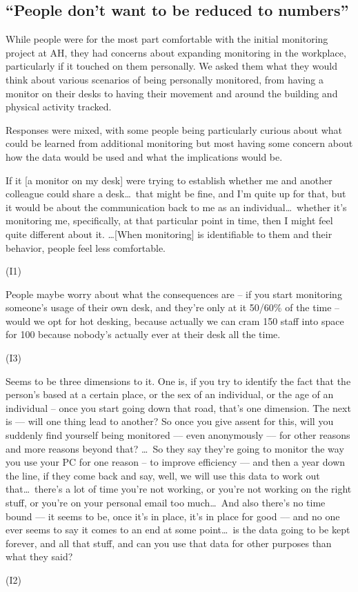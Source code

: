 \subsection{``People don’t want to be reduced to numbers”}
\label{sec:people-dont-want}

While people were for the most part comfortable with the initial
monitoring project at AH, they had concerns about expanding
monitoring in the workplace, particularly if it touched on them
personally. We asked them what they would think about various scenarios of being personally monitored, from having a monitor on their desks to having their movement and around the building and physical activity tracked.

Responses were mixed, with some people being particularly curious about what could be learned from additional monitoring but most having some concern about how the data would be used and what the implications would be.

\begin{qt}If it [a monitor on my desk] were trying to establish whether me and
another colleague could share a desk\ldots\  that might be fine, and I’m quite
up for that, but it would be about the communication back to me as an
individual\ldots\  whether it’s monitoring me, specifically, at that
particular point in time, then I might feel quite different about it.
\ldots [When monitoring] is identifiable to them and their behavior, people feel less
comfortable.\end{qt} (I1)

\begin{qt}People maybe worry about what the
consequences are – if you start monitoring someone’s usage of their
own desk, and they’re only at it 50/60\% of the time – would we opt
for hot desking, because actually we can cram 150 staff into space for
100 because nobody’s actually ever at their desk all the time.\end{qt} (I3)

\begin{qt}Seems to be three dimensions to it. One is, if you try to identify the fact that the person’s
based at a certain place, or the sex of an individual, or the age of
an individual – once you start going down that road, that’s one
dimension. The next is --– will one thing lead to another? So once you
give assent for this, will you suddenly find yourself being monitored
--– even anonymously --– for other reasons and more reasons beyond that? \ldots\  
So they say they’re going to monitor the way you use your PC for one
reason – to improve efficiency –-- and then a year down the line, if
they come back and say, well, we will use this data to work out
that\ldots\  there’s a lot of time you’re not working, or you’re not working
on the right stuff, or you’re on your personal email too much\ldots\  And also there’s no time bound --– it
seems to be, once it’s in place, it’s in place for good –-- and no one
ever seems to say it comes to an end at some point\ldots\  is the data going
to be kept forever, and all that stuff, and can you use that data for
other purposes than what they said?\end{qt} (I2)

